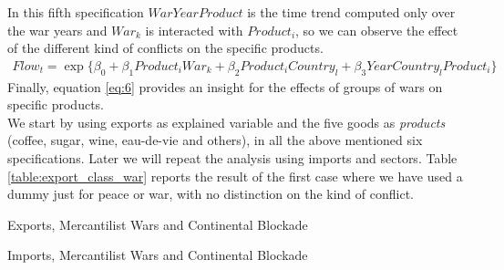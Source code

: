 \documentclass[12pt,a4paper,notitlepage,english]{article}
\begin{document}
In this fifth specification $WarYearProduct$ is the time trend computed only over the war years and $War_k$ is interacted with $Product_i$, so we can observe the effect of the different kind of conflicts on the specific products. 
\begin{multline}\label{eq:6}
Flow_{t}=\exp\{\beta_0+\beta_1Product_iWar_k + \beta_2Product_iCountry_l+\beta_3YearCountry_lProduct_i\}
\end{multline}
Finally, equation \ref{eq:6} provides an insight for the effects of groups of wars on specific products. \\
We start by using exports as explained variable and the five goods as \textit{products} (coffee, sugar, wine, eau-de-vie and others), in all the above mentioned six specifications. Later we will repeat the analysis using imports and sectors. 
Table \ref{table:export_class_war} reports the result of the first case where we have used a dummy just for peace or war, with no distinction on the kind of conflict.
\begin{table}
\begin{center}
\caption {Exports, Mercantilist Wars and Continental Blockade} 
\label{table:export_class_block}
\renewcommand{\arraystretch}{0.6}

\end{center}
\end{table}
\begin{table}
\begin{center}
\caption {Imports, Mercantilist Wars and Continental Blockade} 
\label{table:import_class_block}
\renewcommand{\arraystretch}{0.6}

\end{center}
\end{table}
\end{document}
